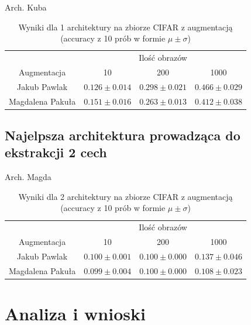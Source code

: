 \documentclass[10pt]{article}
\begin{document}
Arch. Kuba

\begin{table}[H]\centering
    \begin{tabular}{cccc}
        \toprule
                     & \multicolumn{3}{c}{Ilość obrazów}                                          \\ \cmidrule{2-4}
        Augmentacja  & 10                                & 200                & 1000              \\ \midrule
        Jakub Pawlak & $0.126 \pm 0.014 $                & $0.298 \pm 0.021 $ & $0.466 \pm 0.029$ \\
        Magdalena Pakuła & $0.151 \pm 0.016 $                & $0.263 \pm 0.013 $ & $0.412 \pm 0.038$ \\
        \bottomrule
    \end{tabular}
    \caption{Wyniki dla 1 architektury na zbiorze CIFAR z augmentacją (accuracy z 10 prób w formie $\mu \pm \sigma$)}
    \label{tab:augmented_cifar_big}
\end{table}

\subsection*{Najelpsza architektura prowadząca do ekstrakcji 2 cech}

Arch. Magda

\begin{table}[H]\centering
    \begin{tabular}{cccc}
        \toprule
                     & \multicolumn{3}{c}{Ilość obrazów}                                          \\ \cmidrule{2-4}
        Augmentacja  & 10                                & 200                & 1000              \\ \midrule
        Jakub Pawlak & $0.100 \pm 0.001 $                & $0.100 \pm 0.000 $ & $0.137 \pm 0.046$ \\
        Magdalena Pakuła & $0.099 \pm 0.004 $                & $0.100 \pm 0.000 $ & $0.108 \pm 0.023$ \\
        \bottomrule
    \end{tabular}
    \caption{Wyniki dla 2 architektury na zbiorze CIFAR z augmentacją (accuracy z 10 prób w formie $\mu \pm \sigma$)}
    \label{tab:augmented_cifar_small}
\end{table}

\pagebreak
\section{Analiza i wnioski}\label{sec:wyniki}
\end{document}

